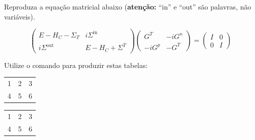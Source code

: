 \documentclass[a4paper,10pt,twocolumn,landscape]{article}
\begin{document}
	\begin{exercicio}
		Reproduza a equação matricial abaixo (\textbf{atenção:} ``in'' e ``out'' são palavras, não variáveis).
		
		\medskip
	
		\[
		\left(\begin{array}{cc}
			E - H_C - \Sigma_T & i\Sigma^\text{in} \\
			i\Sigma^\text{out} & E - H_C + \Sigma^{\bar T}
		\end{array}\right)
		\left(\begin{array}{cc}
			G^T & -iG^n \\
			-iG^p & -G^{\bar T}
		\end{array}\right) = 
		\left(\begin{array}{cc}
			I & 0 \\ 0 & I
		\end{array}\right)
		\]
	\end{exercicio}
	
	\begin{exercicio}
		Utilize o comando  para produzir estas tabelas:
	
		\medskip
		
		\noindent\hfill
		\begin{tabular}{ccc}
			\cline{1-1}
			1 & 2 & 3 \\
			\cline{2-2}
			4 & 5 & 6 \\
			\cline{3-3}
		\end{tabular}\hfill
		\begin{tabular}{ccc}
			\cline{1-1}\cline{3-3}
			1 & 2 & 3 \\
			\cline{2-2}
			4 & 5 & 6 \\
			\cline{1-3}
		\end{tabular}\hfill{}
	\end{exercicio}
		
\end{document}
